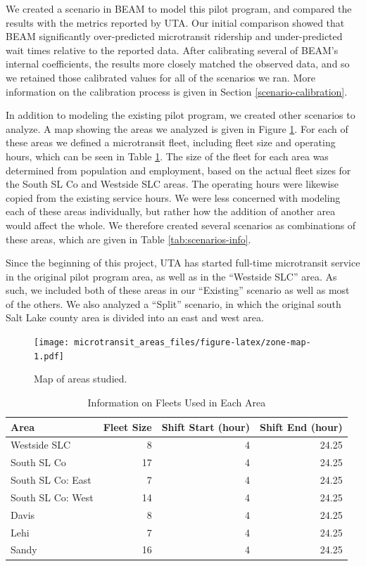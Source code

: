 \documentclass[
]{article}
\begin{document}
We created a scenario in BEAM to model this pilot program, and compared the results with the metrics reported by UTA. Our initial comparison showed that BEAM significantly over-predicted microtransit ridership and under-predicted wait times relative to the reported data. After calibrating several of BEAM's internal coefficients, the results more closely matched the observed data, and so we retained those calibrated values for all of the scenarios we ran. More information on the calibration process is given in Section \ref{scenario-calibration}.

In addition to modeling the existing pilot program, we created other scenarios to analyze. A map showing the areas we analyzed is given in Figure \ref{fig:zone-map}. For each of these areas we defined a microtransit fleet, including fleet size and operating hours, which can be seen in Table \ref{tab:zone-fleets}. The size of the fleet for each area was determined from population and employment, based on the actual fleet sizes for the South SL Co and Westside SLC areas. The operating hours were likewise copied from the existing service hours. We were less concerned with modeling each of these areas individually, but rather how the addition of another area would affect the whole. We therefore created several scenarios as combinations of these areas, which are given in Table \ref{tab:scenarios-info}.

Since the beginning of this project, UTA has started full-time microtransit service in the original pilot program area, as well as in the ``Westside SLC'' area. As such, we included both of these areas in our ``Existing'' scenario as well as most of the others. We also analyzed a ``Split'' scenario, in which the original south Salt Lake county area is divided into an east and west area.

\begin{figure}
\centering
\texttt{[image: microtransit\_areas\_files/figure-latex/zone-map-1.pdf]}
\caption{\label{fig:zone-map}Map of areas studied.}
\end{figure}

\begin{table}

\caption{\label{tab:zone-fleets}Information on Fleets Used in Each Area}
\centering
\begin{tabular}[t]{lrrr}
\toprule
Area & Fleet Size & Shift Start (hour) & Shift End (hour)\\
\midrule
Westside SLC & 8 & 4 & 24.25\\
South SL Co & 17 & 4 & 24.25\\
South SL Co: East & 7 & 4 & 24.25\\
South SL Co: West & 14 & 4 & 24.25\\
Davis & 8 & 4 & 24.25\\
\addlinespace
Lehi & 7 & 4 & 24.25\\
Sandy & 16 & 4 & 24.25\\
\bottomrule
\end{tabular}
\end{table}
\end{document}
